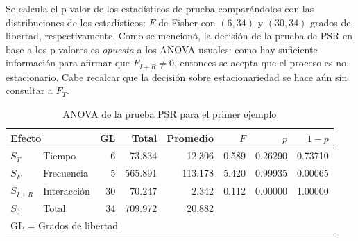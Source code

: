 \documentclass[12pt,letterpaper]{book}
\begin{document}
Se calcula el p-valor de los estadísticos de prueba comparándolos con las distribuciones de los estadísticos: $F$ de Fisher con $(6,34)$ y $(30,34)$ grados de libertad, respectivamente.
%
Como se mencionó, 
la decisión de la prueba de PSR en base a los p-valores es \textit{opuesta} a los ANOVA usuales:
como hay
suficiente información para afirmar que $F_{I+R} \neq 0$, entonces se acepta 
que el proceso es no-estacionario.
%
Cabe recalcar que la decisión sobre estacionariedad se hace aún sin consultar a $F_T$.


\begin{table}
\centering
\caption{ANOVA de la prueba PSR para el primer ejemplo}
\begin{tabular}{llrrrrrr}
\toprule
\multicolumn{2}{l}{Efecto}
                        & GL & Total   & Promedio & $F$   & $p$     & $1-p$   \\
\midrule
$S_T$     & Tiempo      & 6  & 73.834  & 12.306   & 0.589 & 0.26290 & 0.73710 \\
$S_F$     & Frecuencia  & 5  & 565.891 & 113.178  & 5.420 & 0.99935 & 0.00065 \\
$S_{I+R}$ & Interacción & 30 & 70.247  & 2.342    & 0.112 & 0.00000 & 1.00000 \\
$S_0$     & Total       & 34 & 709.972 & 20.882   &       &         &         \\
\bottomrule
\multicolumn{5}{l}{GL = Grados de libertad}
\end{tabular}
\label{tab:ejemplo_gl}
\end{table}
\end{document}
